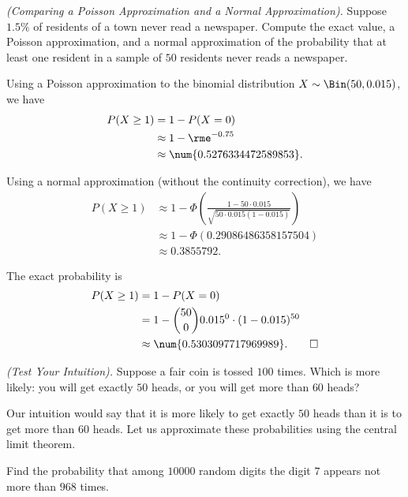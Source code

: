 \begin{problem}[Handout 14, \# 9]
  \emph{(Comparing a Poisson Approximation and a Normal Approximation).}
  Suppose \(1.5\%\) of residents of a town never read a newspaper. Compute
  the exact value, a Poisson approximation, and a normal approximation of
  the probability that at least one resident in a sample of \(50\)
  residents never reads a newspaper.
\end{problem}
\begin{solution}
  Using a Poisson approximation to the binomial distribution
  \(X\sim\Bin(50,0.015)\), we have
  \begin{align*}
    P(X\geq 1)
    &=1-P(X=0)\\
    &\approx 1-\rme^{-0.75}\\
    &\approx\num{0.5276334472589853}.
  \end{align*}

  Using a normal approximation (without the continuity correction), we have
  \begin{align*}
    P(X\geq 1)
    &\approx 1-
      \Phi\left(\frac{1-50\cdot 0.015}{\sqrt{50\cdot
      0.015(1-0.015)}}\right)\\
    &\approx 1-\Phi(\num{0.29086486358157504})\\
    &\approx\num{0.3855792}.
  \end{align*}

  The exact probability is
  \begin{align*}
    P(X\geq 1)
    &=1-P(X=0)\\
    &=1-\binom{50}{0}0.015^0\cdot(1-0.015)^{50}\\
    &\approx\num{0.5303097717969989}.\qedhere
  \end{align*}
\end{solution}
\newpage

\begin{problem}[Handout 14, \# 10]
  \emph{(Test Your Intuition).} Suppose a fair coin is tossed \(100\)
  times. Which is more likely: you will get exactly \(50\) heads, or you
  will get more than \(60\) heads?
\end{problem}
\begin{solution}
  Our intuition would say that it is more likely to get exactly \(50\)
  heads than it is to get more than \(60\) heads. Let us approximate these
  probabilities using the central limit theorem.
\end{solution}
\newpage

\begin{problem}[Handout 14, \# 11]
  Find the probability that among \(\num{10000}\) random digits the digit
  \(7\) appears not more than \(968\) times.
\end{problem}
\begin{solution}

\end{solution}
\newpage

